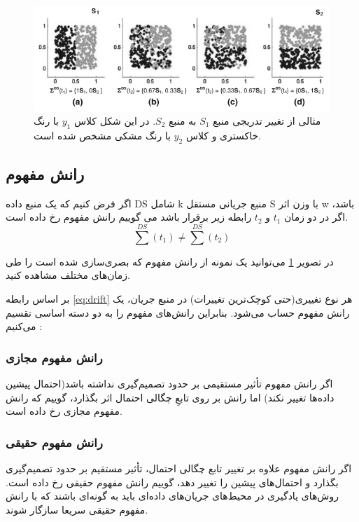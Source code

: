 \begin{figure}%
\centerline{\includegraphics[width=15cm]{drift}}
\caption{مثالی از تغییر تدریجی منبع $S_1$ به منبع $S_2$. در این شکل کلاس $ y_1 $ با رنگ خاکستری و کلاس $ y_2 $ با رنگ مشکی مشخص شده است\cite{narasimhamurthy2007framework}.}
\label{fig:drift}
\end{figure}




\subsection{رانش مفهوم}

 اگر فرض کنیم که یک منبع داده DS شامل k منبع جریانی مستقل S با وزن اثر w باشد، اگر در دو زمان $t_1$ و $t_2$ رابطه زیر برقرار باشد می گوییم رانش مفهوم  رخ داده است.
\begin{equation}
\sum^{DS}(t_1) \neq \sum^{DS}(t_2)
\label{eq:drift}
\end{equation}

در تصویر
\ref{fig:drift}
می‌توانید یک نمونه از رانش مفهوم که بصری‌سازی شده است را طی زمان‌های مختلف مشاهده کنید.

بر اساس رابطه
\ref{eq:drift}
هر نوع تغییری(حتی کوچک‌ترین تغییرات) در منبع جریان، یک رانش مفهوم حساب می‌شود. بنابراین رانش‌های مفهوم را به دو دسته اساسی تقسیم می‌کنیم
\cite{bouguelia2016adaptive}:


\subsubsection{رانش مفهوم مجازی}
اگر رانش مفهوم تأثیر مستقیمی بر حدود تصمیم‌گیری نداشته باشد(احتمال پیشین داده‌ها تغییر نکند) اما رانش بر روی تابعِ چگالی احتمال اثر بگذارد، گوییم که رانش مفهوم مجازی  رخ داده است.

\subsubsection{رانش مفهوم حقیقی}
اگر رانش مفهوم علاوه بر تغییر تابع چگالی احتمال، تأثیر مستقیم بر حدود تصمیم‌گیری بگذارد و احتمال‌های پیشین را تغییر دهد، گوییم رانش مفهوم حقیقی  رخ داده است. روش‌های یادگیری در محیط‌های جریان‌های داده‌ای باید به گونه‌ای باشند که با رانش مفهوم حقیقی سریعا سازگار شوند.



